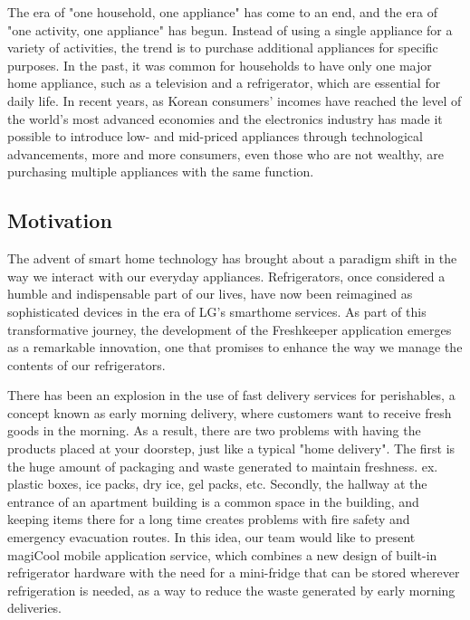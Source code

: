 \documentclass[conference]{IEEEtran}
\begin{document}
The era of "one household, one appliance" has come to an end, and the era of "one activity, one appliance" has begun. Instead of using a single appliance for a variety of activities, the trend is to purchase additional appliances for specific purposes. In the past, it was common for households to have only one major home appliance, such as a television and a refrigerator, which are essential for daily life. In recent years, as Korean consumers' incomes have reached the level of the world's most advanced economies and the electronics industry has made it possible to introduce low- and mid-priced appliances through technological advancements, more and more consumers, even those who are not wealthy, are purchasing multiple appliances with the same function.



\subsection{Motivation}

The advent of smart home technology has brought about a paradigm shift in the way we interact with our everyday appliances. Refrigerators, once considered a humble and indispensable part of our lives, have now been reimagined as sophisticated devices in the era of LG's smarthome services. As part of this transformative journey, the development of the Freshkeeper application emerges as a remarkable innovation, one that promises to enhance the way we manage the contents of our refrigerators.

There has been an explosion in the use of fast delivery services for perishables, a concept known as early morning delivery, where customers want to receive fresh goods in the morning. As a result, there are two problems with having the products placed at your doorstep, just like a typical "home delivery". The first is the huge amount of packaging and waste generated to maintain freshness. ex. plastic boxes, ice packs, dry ice, gel packs, etc. Secondly, the hallway at the entrance of an apartment building is a common space in the building, and keeping items there for a long time creates problems with fire safety and emergency evacuation routes. 
In this idea, our team would like to present magiCool mobile application service, which combines a new design of built-in refrigerator hardware with the need for a mini-fridge that can be stored wherever refrigeration is needed, as a way to reduce the waste generated by early morning deliveries. 
\end{document}
